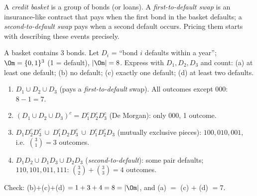 
\begin{problem}
	\begin{context}
		A \emph{credit basket} is a group of bonds (or loans). A
		\emph{first-to-default swap} is an insurance-like contract that pays when
		the first bond in the basket defaults; a \emph{second-to-default swap} pays
		when a second default occurs. Pricing them starts with describing these
		events precisely.
	\end{context}
	A basket contains 3 bonds. Let $D_i$ = ``bond $i$ defaults within a
	year''; $\Om=\{0,1\}^3$ (1 = default), $|\Om|=8$. Express with
	$D_1,D_2,D_3$ and count: (a) at least one default; (b) no default;
	(c) exactly one default; (d) at least two defaults.
\end{problem}

\begin{slides}
	\small
	\exstatement
	\pause
	\sol
	\begin{enumerate}
		\item[(a)] $D_1\cup D_2\cup D_3$ \quad (pays a \emph{first-to-default}
		      swap). All outcomes except $000$: $8-1=7$.
		\item[(b)] $(D_1\cup D_2\cup D_3)^c = D_1^cD_2^cD_3^c$ \quad (De Morgan):
		      only $000$, 1 outcome.
		\item[(c)] $D_1D_2^cD_3^c\ \cup\ D_1^cD_2D_3^c\ \cup\ D_1^cD_2^cD_3$
		      \quad (mutually exclusive pieces): $100,010,001$, i.e.\
		      $\binom31=3$ outcomes.
		\item[(d)] $D_1D_2\cup D_1D_3\cup D_2D_3$ \quad (\emph{second-to-default}):
		      some pair defaults; $110,101,011,111$:
		      $\binom32+\binom33=4$ outcomes.
	\end{enumerate}
	Check: (b)$+$(c)$+$(d) $=1+3+4=8=|\Om|$, and (a) $=$ (c) $+$ (d) $=7$.
\end{slides}

